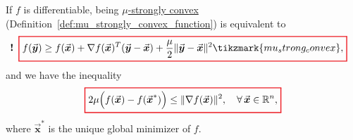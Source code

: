 \documentclass[9pt, headings=standardclasses, parskip=half]{scrartcl}
\newcommand{\vect}[1]{\vec{\boldsymbol{#1}}}
\begin{document}
\newlength{}
{}
\newlength{}
{} 
\tikzexternaldisable
\begin{lemma}
\label{lem:optimality_error_strongly_convex}
If \(f\) is differentiable, being \hyperref[def:mu_strongly_convex_function]{\(\mu\)-strongly convex} (Definition~\ref{def:mu_strongly_convex_function}) is equivalent to
\begin{equation}
\label{eq:strong_convex_differentiable_inequality} %
\llap{\textbf{!}\enspace}
{\color{Red}
\setlength{\fboxrule}{1pt}
\boxed{ 
\color{black}
f(\vect{y})\ge f(\vect{x})+\nabla f(\vect{x})^{T}(\vect{y}-\vect{x})
+\frac{\mu}{2}\|\vect{y}-\vect{x}\|^{2}\tikzmark{mu_strong_convex},%
}
}
\end{equation}
and we have the inequality
\begin{equation}
\label{eq:optimality_error_inequality}
{\color{Red}
\setlength{\fboxrule}{1pt}
\boxed{ 
\color{black}
2\mu\Bigl(f(\vect{x})-f(\vect{x}^{*})\Bigr)\le\|\nabla f(\vect{x})\|^{2},\quad\forall\,\vect{x}\in\mathbb{R}^{n},
}
}
\end{equation}
where \(\vect{x}^{*}\) is the unique global minimizer of \(f\). 
\end{lemma}
\end{document}
